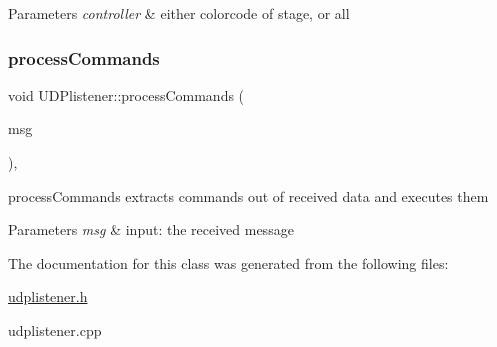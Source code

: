 \begin{DoxyParams}{Parameters}
{\em controller} & either colorcode of stage, or \textquotesingle{}all\textquotesingle{} \\
\hline
\end{DoxyParams}
\mbox{\label{classUDPlistener_a86e1147a1adf1a32ae49d43529cd53f1}} 
\subsubsection{\texorpdfstring{process\+Commands}{processCommands}}
{\footnotesize\ttfamily void U\+D\+Plistener\+::process\+Commands (\begin{DoxyParamCaption}\item[{Q\+String}]{msg }\end{DoxyParamCaption})\hspace{0.3cm}{\ttfamily [private]}, {\ttfamily [slot]}}



process\+Commands extracts commands out of received data and executes them 


\begin{DoxyParams}{Parameters}
{\em msg} & input\+: the received message \\
\hline
\end{DoxyParams}


The documentation for this class was generated from the following files\+:\begin{DoxyCompactItemize}
\item 
\hyperlink{udplistener_8h}{udplistener.\+h}\item 
udplistener.\+cpp\end{DoxyCompactItemize}
